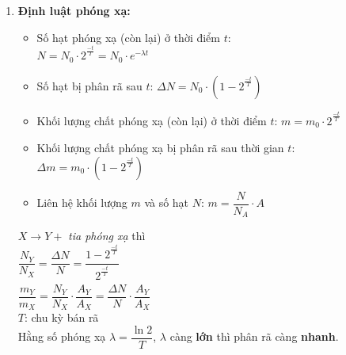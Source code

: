 \documentclass[a4paper,12pt,titlepage,twocolumn]{article}
\newenvironment{myitemize} 
{ \begin{itemize}[leftmargin=*,label=-]  %
		\setlength{\itemsep}{0pt}
		\setlength{\parskip}{0pt}
		\setlength{\parsep}{0pt}     }
{ \end{itemize}                  }
\newenvironment{myenumerate}
{ \begin{enumerate}[label=\textbf{\arabic*}.]
\setlist{nolistsep} %
\setlength{\itemsep}{0pt}
\setlength{\parskip}{0pt}
\setlength{\parsep}{0pt}	}
{ \end{enumerate}}
\begin{document}
\begin{myenumerate}
\begin{myitemize}
		\item Tia $\upgamma$: bản chất là \textbf{sóng điện từ} với bước sóng rất ngắn, khả năng đâm \textbf{rất lớn} so với $\upalpha$, $\upbeta$. (Tia $\upgamma$ \textbf{đi kèm} với phát xạ $\upalpha$, $\upbeta$)
	\end{myitemize}
	\textit{Lưu ý: Tia $\mathit{\alpha,\beta}$ \textbf{lệch} trong điện trường và từ trường, còn tia $\mathit{\gamma}$ thì \textbf{không lệch}}
	\item \textbf{Định luật phóng xạ:}
	\begin{adjustwidth}{-0.5cm}{}
		\begin{myitemize}
			\item Số hạt phóng xạ (còn lại) ở thời điểm $t$: \\ 
			$N = N_0 \cdot 2^{\tfrac{-t}{T}}_{\phantom{i}} = N_0 \cdot e^{-\lambda t}$ %
			\item Số hạt bị phân rã sau $t$: $\Delta N = N_0 \cdot (1-2^{\tfrac{-t}{T}}_{\phantom{i}})$
			\item Khối lượng chất phóng xạ (còn lại) ở thời điểm $t$: $m = m_0 \cdot 2^{\tfrac{-t}{T}}_{\phantom{i}}$
			\item Khối lượng chất phóng xạ bị phân rã sau thời gian $t$: $\Delta m = m_0 \cdot (1-2^{\tfrac{-t}{T}}_{\phantom{i}})$
			\item Liên hệ khối lượng $m$ và số hạt $N$: $m = \dfrac{N}{N_A} \cdot A$
		\end{myitemize}
	\end{adjustwidth}
	$X \rightarrow Y +$ \textit{tia phóng xạ} thì \\
	$\dfrac{N_Y}{N_X} = \dfrac{\Delta N}{N} = \dfrac{1-2^{\tfrac{-t}{T}}_{\phantom{i}}}{2^{\tfrac{-t}{T}}_{\phantom{i}}}$ \\
	$\dfrac{m_Y}{m_X} = \dfrac{N_Y}{N_X} \cdot \dfrac{A_Y}{A_X} = \dfrac{\Delta N}{N} \cdot \dfrac{A_Y}{A_X}$ \\
	$T$: chu kỳ bán rã \\
	Hằng số phóng xạ $\lambda = \dfrac{\ln 2}{T}$, $\lambda$ càng \textbf{lớn} thì phân rã càng \textbf{nhanh}. \\

\end{myenumerate}
\end{document}
